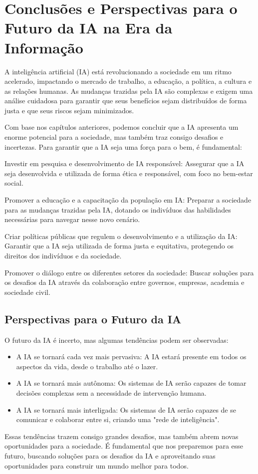 \documentclass[12pt,twoside]{book}
\begin{document}
\chapter{Conclusões e Perspectivas para o Futuro da IA na Era da Informação}

A inteligência artificial (IA) está revolucionando a sociedade em um ritmo acelerado, impactando o mercado de trabalho, a educação, a política, a cultura e as relações humanas. As mudanças trazidas pela IA são complexas e exigem uma análise cuidadosa para garantir que seus benefícios sejam distribuídos de forma justa e que seus riscos sejam minimizados.

Com base nos capítulos anteriores, podemos concluir que a IA apresenta um enorme potencial para a sociedade, mas também traz consigo desafios e incertezas. Para garantir que a IA seja uma força para o bem, é fundamental:

Investir em pesquisa e desenvolvimento de IA responsável: Assegurar que a IA seja desenvolvida e utilizada de forma ética e responsável, com foco no bem-estar social.

Promover a educação e a capacitação da população em IA: Preparar a sociedade para as mudanças trazidas pela IA, dotando os indivíduos das habilidades necessárias para navegar nesse novo cenário.

Criar políticas públicas que regulem o desenvolvimento e a utilização da IA: Garantir que a IA seja utilizada de forma justa e equitativa, protegendo os direitos dos indivíduos e da sociedade.

Promover o diálogo entre os diferentes setores da sociedade: Buscar soluções para os desafios da IA através da colaboração entre governos, empresas, academia e sociedade civil.

\section{Perspectivas para o Futuro da IA}

O futuro da IA é incerto, mas algumas tendências podem ser observadas:
\begin{itemize}
    \item A IA se tornará cada vez mais pervasiva: A IA estará presente em todos os aspectos da vida, desde o trabalho até o lazer.
    \item A IA se tornará mais autônoma: Os sistemas de IA serão capazes de tomar decisões complexas sem a necessidade de intervenção humana.
    \item A IA se tornará mais interligada: Os sistemas de IA serão capazes de se comunicar e colaborar entre si, criando uma "rede de inteligência".
\end{itemize}

Essas tendências trazem consigo grandes desafios, mas também abrem novas oportunidades para a sociedade. É fundamental que nos preparemos para esse futuro, buscando soluções para os desafios da IA e aproveitando suas oportunidades para construir um mundo melhor para todos.
\end{document}
